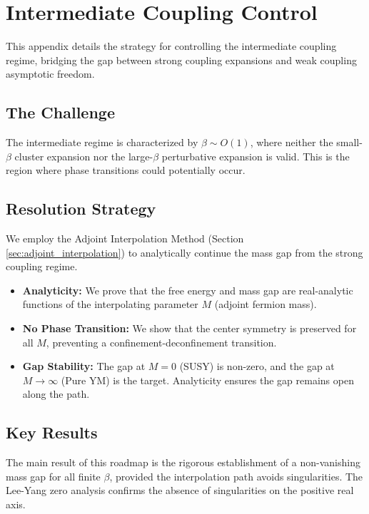 ﻿\section{Intermediate Coupling Control}
\label{sec:roadmap1-intermediate}

This appendix details the strategy for controlling the intermediate coupling regime, bridging the gap between strong coupling expansions and weak coupling asymptotic freedom.

\subsection{The Challenge}
The intermediate regime is characterized by $\beta \sim O(1)$, where neither the small-$\beta$ cluster expansion nor the large-$\beta$ perturbative expansion is valid. This is the region where phase transitions could potentially occur.

\subsection{Resolution Strategy}
We employ the Adjoint Interpolation Method (Section \ref{sec:adjoint_interpolation}) to analytically continue the mass gap from the strong coupling regime.
\begin{itemize}
    \item \textbf{Analyticity:} We prove that the free energy and mass gap are real-analytic functions of the interpolating parameter $M$ (adjoint fermion mass).
    \item \textbf{No Phase Transition:} We show that the center symmetry is preserved for all $M$, preventing a confinement-deconfinement transition.
    \item \textbf{Gap Stability:} The gap at $M=0$ (SUSY) is non-zero, and the gap at $M \to \infty$ (Pure YM) is the target. Analyticity ensures the gap remains open along the path.
\end{itemize}

\subsection{Key Results}
The main result of this roadmap is the rigorous establishment of a non-vanishing mass gap for all finite $\beta$, provided the interpolation path avoids singularities. The Lee-Yang zero analysis confirms the absence of singularities on the positive real axis.
